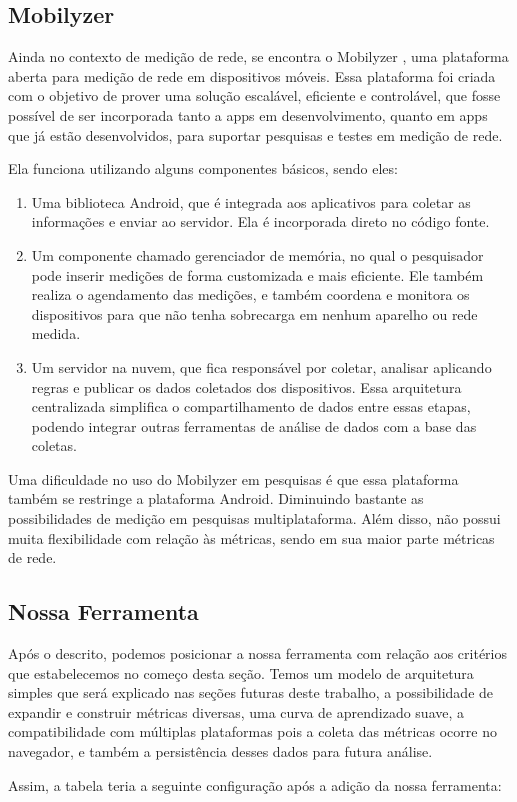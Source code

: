 \documentclass[12pt]{tcc}
\begin{document}
		\subsection{Mobilyzer}
		\par Ainda no contexto de medição de rede, se encontra o Mobilyzer \citep{Nikravesh2015Mobilyzer}, uma plataforma aberta para medição de rede em dispositivos móveis. Essa plataforma foi criada com o objetivo de prover uma solução escalável, eficiente e controlável, que fosse possível de ser incorporada tanto a apps em desenvolvimento, quanto em apps que já estão desenvolvidos, para suportar pesquisas e testes em medição de rede. 
		\par Ela funciona utilizando alguns componentes básicos, sendo eles: 
		\begin{enumerate}
			\item Uma biblioteca Android, que é integrada aos aplicativos para coletar as informações e enviar ao servidor. Ela é incorporada direto no código fonte.
			\item Um componente chamado gerenciador de memória, no qual o pesquisador pode inserir medições de forma customizada e mais eficiente. Ele também realiza o agendamento das medições, e também coordena e monitora os dispositivos para que não tenha sobrecarga em nenhum aparelho ou rede medida. 
			\item Um servidor na nuvem, que fica responsável por coletar, analisar aplicando regras e publicar os dados coletados dos dispositivos. Essa arquitetura centralizada simplifica o compartilhamento de dados entre essas etapas, podendo integrar outras ferramentas de análise de dados com a base das coletas.

		\end{enumerate}
		\par Uma dificuldade no uso do Mobilyzer em pesquisas é que essa plataforma também se restringe a plataforma Android. Diminuindo bastante as possibilidades de medição em pesquisas multiplataforma. Além disso, não possui muita flexibilidade com relação às métricas, sendo em sua maior parte métricas de rede.

		\subsection{Nossa Ferramenta}
		\par Após o descrito, podemos posicionar a nossa ferramenta com relação aos critérios que estabelecemos no começo desta seção. Temos um modelo de arquitetura simples que será explicado nas seções futuras deste trabalho, a possibilidade de expandir e construir métricas diversas, uma curva de aprendizado suave, a compatibilidade com múltiplas plataformas pois a coleta das métricas ocorre no navegador, e também a persistência desses dados para futura análise.
		\par Assim, a tabela teria a seguinte configuração após a adição da nossa ferramenta:
\end{document}
